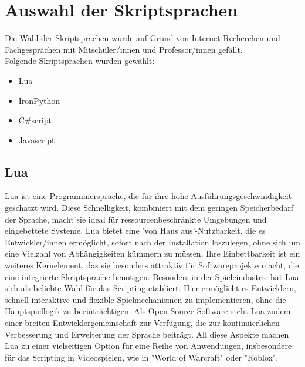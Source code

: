 \section{Auswahl der Skriptsprachen}

Die Wahl der Skriptsprachen wurde auf Grund von Internet-Recherchen 
und Fachgesprächen mit Mitschüler/innen und Professor/innen gefällt.\\
Folgende Skriptsprachen wurden gewählt:

\begin{itemize}
    \item Lua
    \item IronPython
    \item C\#script
    \item Javascript
\end{itemize}

\subsection{Lua}
Lua ist eine Programmiersprache, die für ihre hohe Ausführungsgeschwindigkeit geschätzt wird. 
Diese Schnelligkeit, kombiniert mit dem geringen Speicherbedarf der Sprache, macht sie ideal für ressourcenbeschränkte Umgebungen und eingebettete Systeme. 
Lua bietet eine 'von Haus aus'-Nutzbarkeit, die es Entwickler/innen ermöglicht, sofort nach der Installation loszulegen, ohne sich um eine Vielzahl von Abhängigkeiten kümmern zu müssen. 
Ihre Einbettbarkeit ist ein weiteres Kernelement, das sie besonders attraktiv für Softwareprojekte macht, die eine integrierte Skriptsprache benötigen. Besonders in der Spieleindustrie hat Lua sich als beliebte Wahl für das Scripting etabliert. Hier ermöglicht es Entwicklern, schnell interaktive und flexible Spielmechanismen zu implementieren, ohne die Hauptspiellogik zu beeinträchtigen. 
Als Open-Source-Software steht Lua zudem einer breiten Entwicklergemeinschaft zur Verfügung, die zur kontinuierlichen Verbesserung und Erweiterung der Sprache beiträgt.
All diese Aspekte machen Lua zu einer vielseitigen Option für eine Reihe von Anwendungen, insbesondere für das Scripting in Videospielen, wie in "World of Warcraft" oder "Roblox".
\cite{gameScriptingMastery} \cite{luaDocs} \cite{programingInLua} \cite{nluaWebside} 

\newpage
